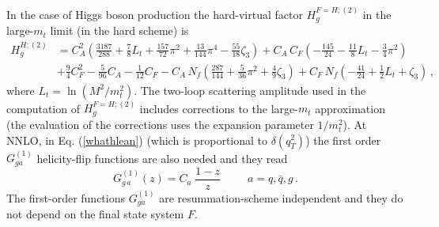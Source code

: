 \documentclass[12pt]{article}
\def\nn{\nonumber}
\newcommand\f[2]{\frac{#1}{#2}}
\def\qt{q_T}
\begin{document}
In the case of Higgs boson production the hard-virtual factor $H^{F=H;(2)}_{g}$ in the large-$m_t$ limit (in the hard scheme) is \cite{Catani:2011kr}
\begin{align}
\label{H2g}
H_g^{H;(2)}&=C_A^2\left(
\f{3187}{288}+\f{7}{8}L_t+\f{157}{72}\pi^2+\f{13}{144}\pi^4-\f{55}{18}\zeta_3\right)+C_A\, C_F\left(-\f{145}{24}-\f{11}{8}L_t-\f{3}{4}\pi^2\right)\nn\\
&+\f{9}{4}C_F^2
-\f{5}{96}C_A-\f{1}{12}C_F-C_A\, N_f\left(\f{287}{144}+\f{5}{36}\pi^2+\f{4}{9}\zeta_3\right)
+C_F\, N_f\left(-\f{41}{24}+\f{1}{2}L_t+\zeta_3\right)\, ,
\end{align}
where $L_t=\ln (M^2/m_t^2)$. The two-loop scattering amplitude \cite{Harlander:2009bw}  used in the computation of  $H^{F=H;(2)}_{g}$ includes corrections to the large-$m_t$ approximation (the evaluation of the corrections uses the expansion parameter $1/m_t^2$).
At NNLO, in Eq. (\ref{whathlean}) (which is proportional to $\delta(\qt^{2})$) the first order $G_{ga}^{(1)}$ helicity-flip functions are also needed and they read \cite{Catani:2010pd}
\begin{equation}
G_{g \,a}^{(1)}(z) = C_a \;\f{1-z}{z}~~~~~~~~~~~a=q,\bar{q},g\, .
\end{equation}
The first-order functions $G_{ga}^{(1)}$ are resummation-scheme independent and they do not depend on the final state system $F$.
\end{document}
